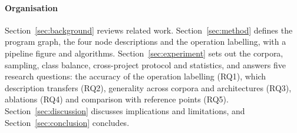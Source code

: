 \paragraph{Organisation} Section~\ref{sec:background} reviews related work.
Section~\ref{sec:method} defines the program graph, the four node descriptions
and the operation labelling, with a pipeline figure and algorithms.
Section~\ref{sec:experiment} sets out the corpora, sampling, class balance,
cross-project protocol and statistics, and answers five research questions:
the accuracy of the operation labelling (RQ1), which description transfers
(RQ2), generality across corpora and architectures (RQ3), ablations (RQ4) and
comparison with reference points (RQ5). Section~\ref{sec:discussion} discusses
implications and limitations, and Section~\ref{sec:conclusion} concludes.
